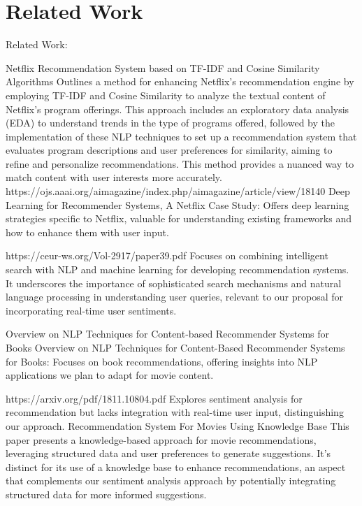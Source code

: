 \documentclass[11pt,a4paper]{article}
\begin{document}
\section{Related Work}


Related Work:

Netflix Recommendation System based on TF-IDF and Cosine Similarity Algorithms
Outlines a method for enhancing Netflix's recommendation engine by employing TF-IDF and Cosine Similarity to analyze the textual content of Netflix's program offerings. This approach includes an exploratory data analysis (EDA) to understand trends in the type of programs offered, followed by the implementation of these NLP techniques to set up a recommendation system that evaluates program descriptions and user preferences for similarity, aiming to refine and personalize recommendations. This method provides a nuanced way to match content with user interests more accurately.
https://ojs.aaai.org/aimagazine/index.php/aimagazine/article/view/18140
Deep Learning for Recommender Systems, A Netflix Case Study: Offers deep learning strategies specific to Netflix, valuable for understanding existing frameworks and how to enhance them with user input.

https://ceur-ws.org/Vol-2917/paper39.pdf
Focuses on combining intelligent search with NLP and machine learning for developing recommendation systems. It underscores the importance of sophisticated search mechanisms and natural language processing in understanding user queries, relevant to our proposal for incorporating real-time user sentiments.

Overview on NLP Techniques for Content-based Recommender Systems for Books
Overview on NLP Techniques for Content-Based Recommender Systems for Books: Focuses on book recommendations, offering insights into NLP applications we plan to adapt for movie content.

https://arxiv.org/pdf/1811.10804.pdf
Explores sentiment analysis for recommendation but lacks integration with real-time user input, distinguishing our approach.
Recommendation System For Movies Using Knowledge Base
This paper presents a knowledge-based approach for movie recommendations, leveraging structured data and user preferences to generate suggestions. It's distinct for its use of a knowledge base to enhance recommendations, an aspect that complements our sentiment analysis approach by potentially integrating structured data for more informed suggestions.
\end{document}
